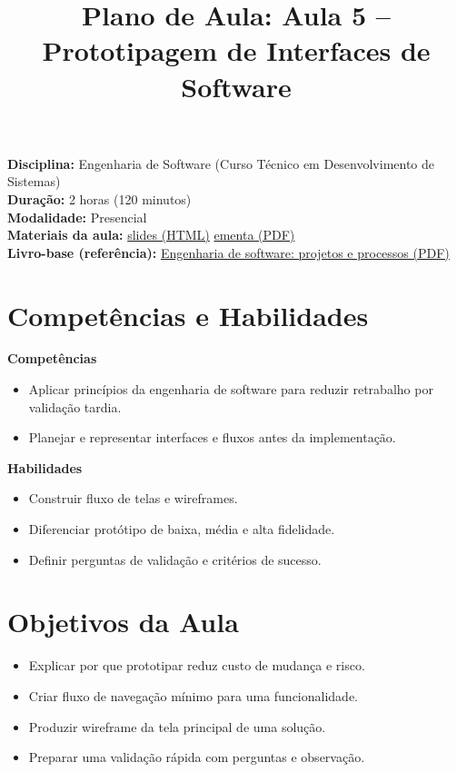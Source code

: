 \documentclass[12pt,a4paper]{article}
\title{Plano de Aula: Aula 5 -- Prototipagem de Interfaces de Software}
\date{}
\begin{document}
\maketitle

\noindent
\textbf{Disciplina:} Engenharia de Software (Curso Técnico em Desenvolvimento de Sistemas)\\
\textbf{Duração:} 2 horas (120 minutos)\\
\textbf{Modalidade:} Presencial\\
\textbf{Materiais da aula:} \href{aula-05.html}{slides (HTML)} \quad \href{aula-05.pdf}{ementa (PDF)}\\
\textbf{Livro-base (referência):} \href{../99-Materiais/Engenharia%20de%20software%20projetos%20e%20processos%20by%20Wilson%20de%20P%C3%A1dua%20Paula%20Filho%20.epub.pdf}{Engenharia de software: projetos e processos (PDF)}

\section{Competências e Habilidades}
\textbf{Competências}
\begin{itemize}[leftmargin=*,itemsep=0.25em]
  \item Aplicar princípios da engenharia de software para reduzir retrabalho por validação tardia.
  \item Planejar e representar interfaces e fluxos antes da implementação.
\end{itemize}

\textbf{Habilidades}
\begin{itemize}[leftmargin=*,itemsep=0.25em]
  \item Construir fluxo de telas e wireframes.
  \item Diferenciar protótipo de baixa, média e alta fidelidade.
  \item Definir perguntas de validação e critérios de sucesso.
\end{itemize}

\section{Objetivos da Aula}
\begin{itemize}[leftmargin=*,itemsep=0.25em]
  \item Explicar por que prototipar reduz custo de mudança e risco.
  \item Criar fluxo de navegação mínimo para uma funcionalidade.
  \item Produzir wireframe da tela principal de uma solução.
  \item Preparar uma validação rápida com perguntas e observação.
\end{itemize}
\end{document}
